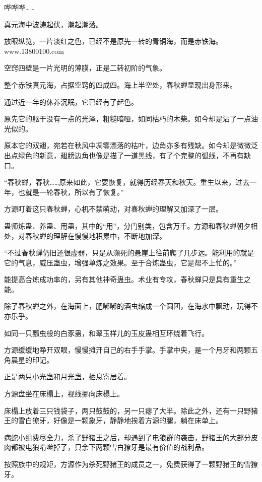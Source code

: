 
\begin{this_body}

哗哗哗……

真元海中波涛起伏，潮起潮落。

放眼纵览，一片淡红之色，已经不是原先一转的青铜海，而是赤铁海。www.13800100.com

空窍四壁是一片光明的薄膜，正是二转初阶的气象。

整个赤铁真元海，占据空窍的四成四。海上半空处，春秋蝉显现出身形来。

通过近一年的休养沉眠，它已经有了起色。

原先它的躯干没有一点的光泽，粗糙暗哑，如同枯朽的木柴。如今却是沾了一点油光似的。

原本它的双翅，宛若在秋风中凋零漂落的枯叶，边角亦多有残缺。如今却是微微泛出点绿色的新意，翅膀边角也像是描了一道黑线，有了个完整的弧线，不再有缺口。

“春秋蝉，春秋……原来如此，它要恢复，就得历经春天和秋天。重生以来，过去一年，也就是一轮春秋，所以有了恢复。”

方源盯着这只春秋蝉，心机不禁萌动，对春秋蝉的理解又加深了一层。

蛊师炼蛊、养蛊、用蛊，其中的“用”，分门别类，包含万千。方源和春秋蝉朝夕相处，对春秋蝉的理解在慢慢地积累中，不断地加深。

“不过春秋蝉仍旧还很虚弱，只是从濒死的悬崖上往前爬了几步远。能利用的就是它的气息，威压蛊虫，增强单炼之效果。至于合炼蛊虫，它是帮不上忙的。”

能提高合炼成功率的，另有其他神奇蛊虫。术业有专攻，春秋蝉只是具有重生之能。

除了春秋蝉之外，在海面上，肥嘟嘟的酒虫缩成一个圆团，在海水中飘动，玩得不亦乐乎。

如同一只瓢虫般的白豕蛊，和翠玉样儿的玉皮蛊相互环绕着飞行。

方源缓缓地睁开双眼，慢慢摊开自己的右手手掌。手掌中央，是一个月牙和两颗五角晨星的印记。

正是两只小光蛊和月光蛊，栖息寄居着。

方源盘坐在床榻上，视线挪向床榻上。

床榻上放着三只钱袋子，两只鼓鼓的，另一只瘪了大半。除此之外，还有一只野猪王的雪白獠牙，好像是一颗象牙，静静地挨着方源的腿，躺在床单上。

病蛇小组费尽全力，杀了野猪王之后，却遇到了电狼群的袭击，野猪王的大部分皮肉都被电狼啃噬掉了，只余下两颗雪白獠牙是最有价值的战利品。

按照族中的规矩，方源作为杀死野猪王的成员之一，免费获得了一颗野猪王的雪獠牙。


\end{this_body}

